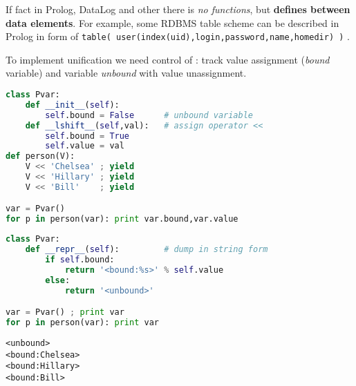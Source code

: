 If fact in Prolog, DataLog and other  there is \emph{no
functions}, but \textbf{ defines  between data
elements}.
For example, some RDBMS table scheme can be described in Prolog in form of
 \verb|table( user(index(uid),login,password,name,homedir) )| .

\bigskip
To implement unification we need control of : track value
assignment (\emph{bound} variable) and variable \emph{unbound} with value
unassignment.
\begin{lstlisting}[language=Python]
class Pvar:
    def __init__(self):
        self.bound = False  	# unbound variable
    def __lshift__(self,val):	# assign operator <<
        self.bound = True
        self.value = val
def person(V):
    V << 'Chelsea' ; yield
    V << 'Hillary' ; yield
    V << 'Bill'    ; yield

var = Pvar()
for p in person(var): print var.bound,var.value
\end{lstlisting}

\begin{lstlisting}[language=Python]
class Pvar:
    def __repr__(self):         # dump in string form
        if self.bound:
            return '<bound:%s>' % self.value
        else:
            return '<unbound>'

var = Pvar() ; print var
for p in person(var): print var
\end{lstlisting}
\begin{lstlisting}
<unbound>
<bound:Chelsea>
<bound:Hillary>
<bound:Bill>
\end{lstlisting}